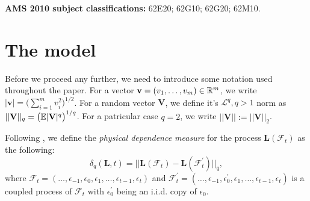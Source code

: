 \documentclass[a4paper,12pt]{article}
\begin{document}
\textbf{AMS 2010 subject classifications:} 62E20; 62G10; 62G20; 62M10. 

\vspace{-0.25cm}

\allowdisplaybreaks[1]

%

\section{The model}\label{sec-model}

Before we proceed any further, we need to introduce some notation used throughout the paper. For a vector $\mathbf{v} = (v_1, \ldots, v_m)\in\mathbb{R}^m$, we write $|\mathbf{v}| = \big(\sum_{i=1}^m v_i^2\big)^{1/2}$. For a random vector $\mathbf{V}$, we define it's $\mathcal{L}^q, q>1$ norm as $||\mathbf{V}||_q = \big(\mathbb{E} |\mathbf{V}|^q\big)^{1/q}$. For a patricular case $q = 2$, we write $||\mathbf{V}|| := ||\mathbf{V}||_2$.

Following \cite{Wu2005}, we define the \textit{physical dependence measure} for the process $\mathbf{L}(\mathcal{F}_t)$ as the following:
\[ \delta_q(\mathbf{L}, t) = || \mathbf{L}(\mathcal{F}_t) - \mathbf{L}(\mathcal{F}_t^\prime) ||_q,
\]
where $\mathcal{F}_t  = (\ldots, \epsilon_{-1}, \epsilon_0, \epsilon_1, \ldots, \epsilon_{t-1}, \epsilon_t)$ and $\mathcal{F}_t^\prime  = (\ldots, \epsilon_{-1}, \epsilon^\prime_0, \epsilon_1, \ldots, \epsilon_{t-1}, \epsilon_t)$ is a coupled process of $\mathcal{F}_t$ with $\epsilon_0^\prime$ being an i.i.d. copy of $\epsilon_0$.
\end{document}
